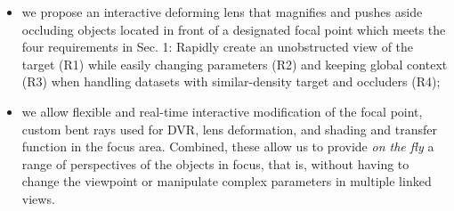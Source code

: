 \begin{itemize}
\item  we propose an interactive deforming lens that magnifies and pushes aside occluding objects located in front of a designated focal point which meets the four requirements in Sec. 1: 
Rapidly create an unobstructed view of the target (R1) while easily changing parameters (R2) and keeping global context (R3) when handling datasets with similar-density target and occluders (R4);
\item we allow flexible and real-time interactive modification of the focal point, custom bent rays used for DVR, lens deformation, and shading and transfer function in the focus area. Combined, these allow us to provide \emph{on the fly} a range of perspectives of the objects in focus, that is, without having to change the viewpoint or manipulate complex parameters in multiple linked views.
\end{itemize}


